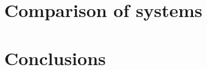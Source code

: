 \documentclass[conference]{IEEEtran}
\begin{document}
\section{Comparison of systems}

\section{Conclusions}



\end{document}
